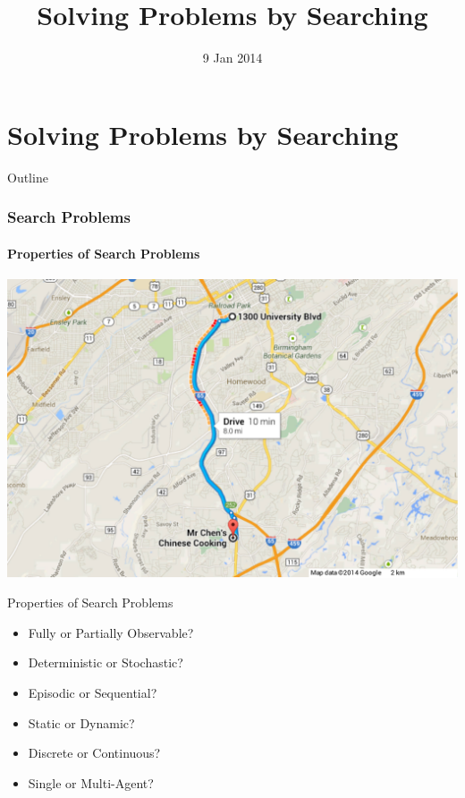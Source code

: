 \documentclass[14pt]{beamer}
\title{Solving Problems by Searching}
\date[]{9 Jan 2014}
\begin{document}
\begin{frame}
  \titlepage
\end{frame}

\part{Solving Problems by Searching}

\begin{frame}{Outline}
	\footnotesize
  \tableofcontents
\end{frame}

\section{Search Problems}

\subsection{Properties of Search Problems}
\begin{frame}[plain]
	\begin{center}
		\includegraphics[width=\textwidth]{uab-to-mr-chens.pdf}
	\end{center}
\end{frame}

\begin{frame}{Properties of Search Problems}
	\begin{itemize}
		\item \alert<2->{Fully} or Partially Observable?
		\item \alert<2->{Deterministic} or Stochastic?
		\item Episodic or \alert<2->{Sequential}?
		\item \alert<2->{Static} or Dynamic?
		\item \alert<2->{Discrete} or Continuous?
		\item \alert<2->{Single} or Multi-Agent?
	\end{itemize}
\end{frame}
\end{document}
